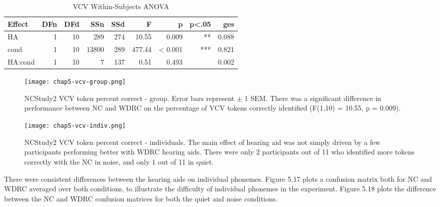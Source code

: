 \begin{table}[htp]
\begin{center}
\begin{tabular}{lrrrrrrrr}
       Effect & DFn & DFd  &  SSn &  SSd  &    F  &     p & p<.05  &   ges \\
       \hline
          HA &  1 & 10 & 289 & 274 & 10.55 & 0.009 &    ** & 0.088 \\
        cond &  1 & 10 & 13800 & 289 & 477.44 & < 0.001 &    *** & 0.821 \\
     HA:cond &  1 & 10 & 7 & 137 &  0.51 & 0.493  &     & 0.002 \\
     \hline
\end{tabular}
\end{center}
\caption{VCV Within-Subjects ANOVA}
\end{table}

\begin{figure}[htp]
\begin{center}
\texttt{[image: chap5-vcv-group.png]} \\
\caption[NCStudy2 VCV token percent correct - group]{NCStudy2 VCV token percent correct - group.  Error bars represent $\pm$ 1 SEM.  There was a significant difference in performance between NC and WDRC on the percentage of VCV tokens correctly identified (F(1,10) = 10.55, p = 0.009).}
\label{ch5-vcv-group}
\end{center}
\end{figure}

\begin{figure}[htp]
\begin{center}
\texttt{[image: chap5-vcv-indiv.png]} \\
\caption[NCStudy2 VCV token percent correct - individuals]{NCStudy2 VCV token percent correct - individuals.  The main effect of hearing aid was not simply driven by a few participants performing better with WDRC hearing aids.  There were only 2 participants out of 11 who identified more tokens correctly with the NC in noise, and only 1 out of 11 in quiet.}
\label{ch5-vcv-indiv}
\end{center}
\end{figure}

There were consistent differences between the hearing aids on individual phonemes.  Figure 5.17 plots a confusion matrix both for NC and WDRC averaged over both conditions, to illustrate the difficulty of individual phonemes in the experiment.  Figure 5.18 plots the difference between the NC and WDRC confusion matrices for both the quiet and noise conditions.

